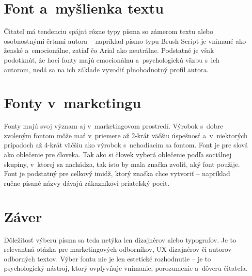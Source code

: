 \documentclass[a4paper, 11pt]{article}
\begin{document}
\section{Font a~myšlienka textu}
Čitateľ má tendenciu spájať rôzne typy písma so zámerom textu alebo osobnostnými črtami autora – napríklad písmo typu Brush Script
je vnímané ako ženské a~emocionálne, zatiaľ čo Arial ako neutrálne.\cite{hlavnickova}
Podstatné je však podotknúť, že hoci fonty majú emocionálnu a~psychologickú väzbu 
s~ich autorom, nedá sa na ich základe vyvodiť plnohodnotný profil autora.\cite{Fajkusova}

\section{Fonty v~marketingu}
Fonty majú svoj význam aj v~marketingovom prostredí. Výrobok s~dobre zvoleným fontom môže mať 
v~priemere až 2-krát väčšiu úspešnosť a~v~niektorých prípadoch až 4-krát väčšiu ako výrobok s~nehodiacim sa fontom.\cite{blueghost}
Font je pre slová ako oblečenie pre človeka. Tak ako si človek vyberá oblečenie podľa sociálnej skupiny, v~ktorej sa nachádza,
tak isto by mala značka zvoliť, aký font použije.\cite{Grigerova} Font je podstatný pre celkový imidž, ktorý značka chce vytvoriť – napríklad
ručne písané názvy dávajú zákazníkovi priateľský pocit.\cite{Izadi}

\section{Záver}
Dôležitosť výberu písma sa teda netýka len dizajnérov alebo typografov. Je to relevantná otázka pre marketingových 
odborníkov, UX dizajnérov či autorov odborných textov. Výber fontu nie je len estetické rozhodnutie – je 
to psychologický nástroj, ktorý ovplyvňuje vnímanie, porozumenie a~dôveru čitateľa.


\newpage
\printbibliography
\end{document}

